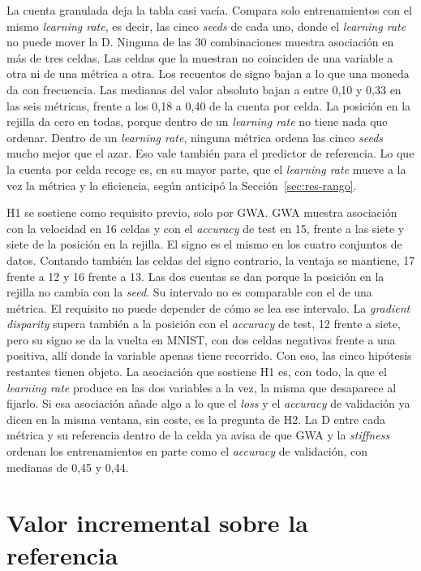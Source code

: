 La cuenta granulada deja la tabla casi vacía. Compara solo entrenamientos con el mismo \emph{learning rate}, es decir, las cinco \emph{seeds} de cada uno, donde el \emph{learning rate} no puede mover la D. Ninguna de las 30 combinaciones muestra asociación en más de tres celdas. Las celdas que la muestran no coinciden de una variable a otra ni de una métrica a otra. Los recuentos de signo bajan a lo que una moneda da con frecuencia. Las medianas del valor absoluto bajan a entre 0,10 y 0,33 en las seis métricas, frente a los 0,18 a 0,40 de la cuenta por celda. La posición en la rejilla da cero en todas, porque dentro de un \emph{learning rate} no tiene nada que ordenar. Dentro de un \emph{learning rate}, ninguna métrica ordena las cinco \emph{seeds} mucho mejor que el azar. Eso vale también para el predictor de referencia. Lo que la cuenta por celda recoge es, en su mayor parte, que el \emph{learning rate} mueve a la vez la métrica y la eficiencia, según anticipó la Sección~\ref{sec:res-rango}.

H1 se sostiene como requisito previo, solo por GWA. GWA muestra asociación con la velocidad en 16 celdas y con el \emph{accuracy} de test en 15, frente a las siete y siete de la posición en la rejilla. El signo es el mismo en los cuatro conjuntos de datos. Contando también las celdas del signo contrario, la ventaja se mantiene, 17 frente a 12 y 16 frente a 13. Las dos cuentas se dan porque la posición en la rejilla no cambia con la \emph{seed}. Su intervalo no es comparable con el de una métrica. El requisito no puede depender de cómo se lea ese intervalo. La \emph{gradient disparity} supera también a la posición con el \emph{accuracy} de test, 12 frente a siete, pero su signo se da la vuelta en MNIST, con dos celdas negativas frente a una positiva, allí donde la variable apenas tiene recorrido. Con eso, las cinco hipótesis restantes tienen objeto. La asociación que sostiene H1 es, con todo, la que el \emph{learning rate} produce en las dos variables a la vez, la misma que desaparece al fijarlo. Si esa asociación añade algo a lo que el \emph{loss} y el \emph{accuracy} de validación ya dicen en la misma ventana, sin coste, es la pregunta de H2. La D entre cada métrica y su referencia dentro de la celda ya avisa de que GWA y la \emph{stiffness} ordenan los entrenamientos en parte como el \emph{accuracy} de validación, con medianas de 0,45 y 0,44.

\section{Valor incremental sobre la referencia}
\label{sec:res-incremental}

